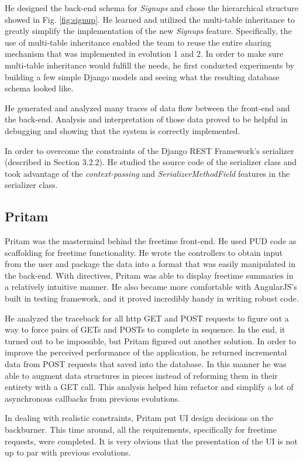 \documentclass[a4paper]{article}
\begin{document}
He designed the back-end schema for \emph{Signups} and chose the hierarchical structure showed in Fig. \ref{fig:signup}. He learned and utilized the multi-table inheritance to greatly simplify the implementation of the new \emph{Signups} feature. Specifically, the use of multi-table inheritance enabled the team to reuse the entire sharing mechanism that was implemented in evolution 1 and 2. In order to make sure multi-table inheritance would fulfill the needs, he first conducted experiments by building a few simple Django models and seeing what the resulting database schema looked like. 

He generated and analyzed many traces of data flow between the front-end and the back-end. Analysis and interpretation of those data proved to be helpful in debugging and showing that the system is correctly implemented. 

In order to overcome the constraints of the Django REST Framework's serializer (described in Section 3.2.2). He studied the source code of the serializer class and took advantage of the \emph{context-passing} and \emph{SerializerMethodField} features in the serializer class. 

\subsection{Pritam}
Pritam was the mastermind behind the freetime front-end. He used PUD code as scaffolding for freetime functionality. He wrote the controllers to obtain input from the user and package the data into a format that was easily manipulated in the back-end. With directives, Pritam was able to display freetime summaries in a relatively intuitive manner. He also became more comfortable with AngularJS's built in testing framework, and it proved incredibly handy in writing robust code.

He analyzed the traceback for all http GET and POST requests to figure out a way to force pairs of GETs and POSTs to complete in sequence. In the end, it turned out to be impossible, but Pritam figured out another solution. In order to improve the perceived performance of the application, he returned incremental data from POST requests that saved into the database. In this manner he was able to augment data structures in pieces instead of reforming them in their entirety with a GET call. This analysis helped him refactor and simplify a lot of asynchronous callbacks from previous evolutions.

In dealing with realistic constraints, Pritam put UI design decisions on the backburner. This time around, all the requirements, specifically for freetime requests, were completed. It is very obvious that the presentation of the UI is not up to par with previous evolutions. 
\end{document}
